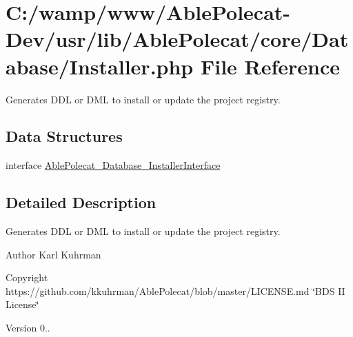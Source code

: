 \hypertarget{_installer_8php}{}\section{C\+:/wamp/www/\+Able\+Polecat-\/\+Dev/usr/lib/\+Able\+Polecat/core/\+Database/\+Installer.php File Reference}
\label{_installer_8php}


Generates D\+D\+L or D\+M\+L to install or update the project registry.  


\subsection*{Data Structures}
\begin{DoxyCompactItemize}
\item 
interface \hyperlink{interface_able_polecat___database___installer_interface}{Able\+Polecat\+\_\+\+Database\+\_\+\+Installer\+Interface}
\end{DoxyCompactItemize}


\subsection{Detailed Description}
Generates D\+D\+L or D\+M\+L to install or update the project registry. 

\begin{DoxyAuthor}{Author}
Karl Kuhrman 
\end{DoxyAuthor}
\begin{DoxyCopyright}{Copyright}
https\+://github.com/kkuhrman/\+Able\+Polecat/blob/master/\+L\+I\+C\+E\+N\+S\+E.\+md \char`\"{}\+B\+D\+S I\+I License\char`\"{} 
\end{DoxyCopyright}
\begin{DoxyVersion}{Version}
0.. 
\end{DoxyVersion}
